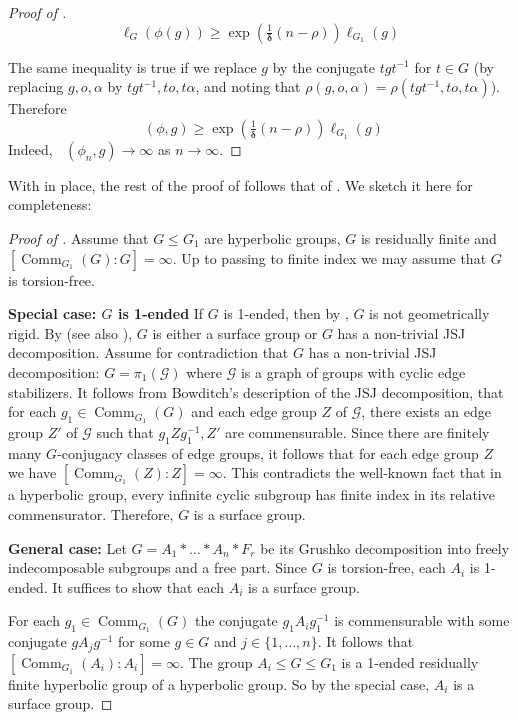 \documentclass{amsart}
\numberwithin{equation}{section}
\theoremstyle{definition}
\newcommand{\calG}{\mathcal{G}}
\newcommand{\ii}{^{-1}}
\newcommand{\bdelta}{{\boldsymbol\delta}}
\DeclareMathOperator{\Comm}{Comm}
\DeclareMathOperator{\AL}{\ell_{Avg}}
\begin{document}
\begin{proof}[Proof of ]
$$
    \ell_G(\phi(g))\ge \exp(\tfrac 1 \bdelta (n-\rho)) \ell_{G_1}(g)
$$

The same inequality is true if we replace $g$ by the conjugate $tgt\ii$ for $t\in G$ (by replacing $g,o,\alpha$ by $tgt\ii,to, t\alpha$, and noting that $\rho(g,o,\alpha)=\rho(tgt\ii,to,t\alpha)$).
Therefore 
$$\AL(\phi,g) \ge \exp(\tfrac 1 \bdelta (n-\rho)) \ell_{G_1}(g)
$$
Indeed, $\AL(\phi_n,g)\to \infty$ as $n\to \infty$.
\end{proof}

With  in place,
the rest of the proof of    follows that of \cite{lazarovich2023commensurated}. We sketch it here for completeness:

\begin{proof}[Proof of ]
Assume that $G\le G_1$ are hyperbolic groups, $G$ is residually finite and $[\Comm_{G_1}(G):G]=\infty$.
Up to passing to finite index we may assume that $G$ is torsion-free.

\textbf{Special case: $G$ is 1-ended} If $G$ is 1-ended, then by , $G$ is not geometrically rigid. 
By \cite{bowditchjsj} (see also \cite{selajsj}), $G$ is either a surface group or $G$ has a non-trivial JSJ decomposition.
Assume for contradiction that $G$ has a non-trivial JSJ decomposition:  $G=\pi_1(\calG)$ where $\calG$ is a graph of groups with cyclic edge stabilizers. 
It follows from Bowditch's description of the JSJ decomposition, that for each $g_1\in \Comm_{G_1}(G)$ and each edge group $Z$ of $\calG$, there exists an edge group $Z'$ of $\calG$ such that $g_1Zg_1\ii,Z'$ are commensurable. 
Since there are finitely many $G$-conjugacy classes of edge groups, it follows that for each edge group $Z$ we have $[\Comm_{G_1}(Z):Z]=\infty$. This contradicts the well-known fact that in a hyperbolic group, every infinite cyclic subgroup has finite index in its relative commensurator.
Therefore, $G$ is a surface group.

\textbf{General case:}  
Let $G = A_1*\dots *A_n * F_r$ be its Grushko decomposition into freely indecomposable subgroups and a free part. 
Since $G$ is torsion-free, each $A_i$ is 1-ended.
It suffices to show that each $A_i$ is a surface group.

For each $g_1\in \Comm_{G_1}(G)$ the conjugate $g_1A_ig_1\ii$ is commensurable with some conjugate $gA_jg\ii$ for some $g\in G$ and $j\in\{1,\dots,n\}$.
It follows that $[\Comm_{G_1}(A_i):A_i]=\infty$.
The group $A_i\le G\le G_1$ is a 1-ended residually finite hyperbolic group of a hyperbolic group. So by the special case, $A_i$ is a surface group.
\end{proof}



\end{document}
